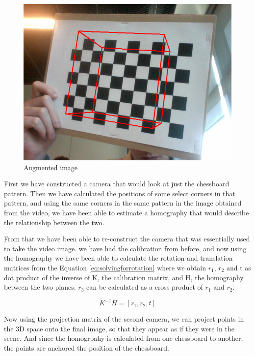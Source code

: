 \begin{figure}[h!]
	\centering
	\includegraphics[width=\textwidth]{final/images/augmentation1.png}
	\caption{Augmented image}
	\label{fig:augment}
\end{figure}

First we have constructed a camera that would look at just the chessboard pattern. Then we have calculated the positions of some select corners in that pattern, and using the same corners in the same pattern in the image obtained from the video, we have been able to estimate a homography that would describe the relationship between the two.

From that we have been able to re-construct the camera that was essentially used to take the video image. we have had the calibration from before, and now using the homography we have been able to calculate the rotation and translation matrices from the Equation \ref{eq:solvingforrotation} where we obtain $r_{1}$, $r_{2}$ and t as dot product of the inverse of K, the calibration matrix, and H, the homography between the two planes. $r_{3}$ can be calculated as a cross product of $r_{1}$ and $r_{2}$.

\begin{equation}
	K^{-1}H = [r_{1}, r_{2}, t]
	\label{eq:solvingforrotation}
\end{equation}

Now using the projection matrix of the second camera, we can project points in the 3D space onto the final image, so that they appear as if they were in the scene. And since the homogrpahy is calculated from one chessboard to another, the points are anchored the position of the chessboard.

